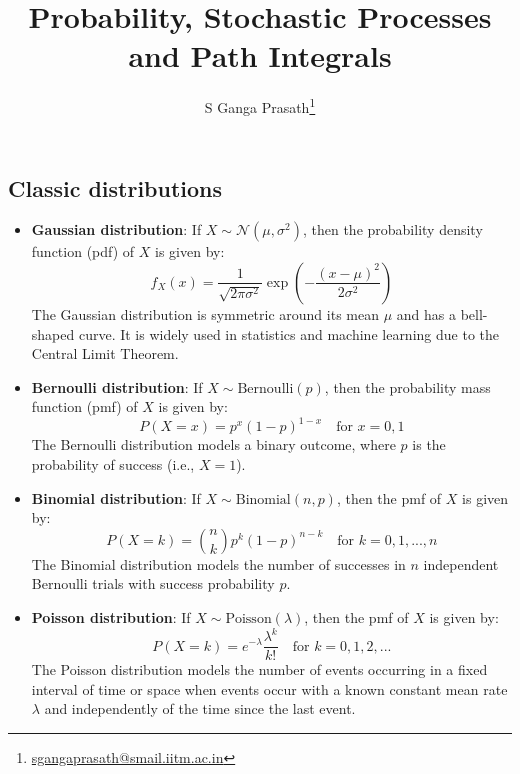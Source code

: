 \documentclass[12pt]{article}
\title{Probability, Stochastic Processes and Path Integrals}
\author{S Ganga Prasath\thanks{\href{mailto:sgangaprasath@smail.iitm.ac.in}{sgangaprasath@smail.iitm.ac.in}}}
\date{}
\begin{document}
\maketitle
\begin{singlespace}

\section{Classic distributions}
\begin{itemize}
    \item \textbf{Gaussian distribution}: If $X \sim \mathcal{N}(\mu, \sigma^2)$, then the probability density function (pdf) of $X$ is given by:
    \[
    f_X(x) = \frac{1}{\sqrt{2\pi\sigma^2}} \exp\left(-\frac{(x - \mu)^2}{2\sigma^2}\right)
    \]
    The Gaussian distribution is symmetric around its mean $\mu$ and has a bell-shaped curve. It is widely used in statistics and machine learning due to the Central Limit Theorem.

    \item \textbf{Bernoulli distribution}: If $X \sim \text{Bernoulli}(p)$, then the probability mass function (pmf) of $X$ is given by:
    \[
    P(X = x) = p^x (1-p)^{1-x} \quad \text{for } x = 0, 1
    \]
    The Bernoulli distribution models a binary outcome, where $p$ is the probability of success (i.e., $X=1$).

    \item \textbf{Binomial distribution}: If $X \sim \text{Binomial}(n, p)$, then the pmf of $X$ is given by:
    \[
    P(X = k) = \binom{n}{k} p^k (1-p)^{n-k} \quad \text{for } k = 0, 1, ..., n
    \]
    The Binomial distribution models the number of successes in $n$ independent Bernoulli trials with success probability $p$.

    \item \textbf{Poisson distribution}: If $X \sim \text{Poisson}(\lambda)$, then the pmf of $X$ is given by:
    \[
    P(X = k) = e^{-\lambda} \frac{\lambda^k}{k!} \quad \text{for } k = 0, 1, 2, ...
    \]
    The Poisson distribution models the number of events occurring in a fixed interval of time or space when events occur with a known constant mean rate $\lambda$ and independently of the time since the last event.
\end{itemize}

\end{singlespace}
\end{document}
